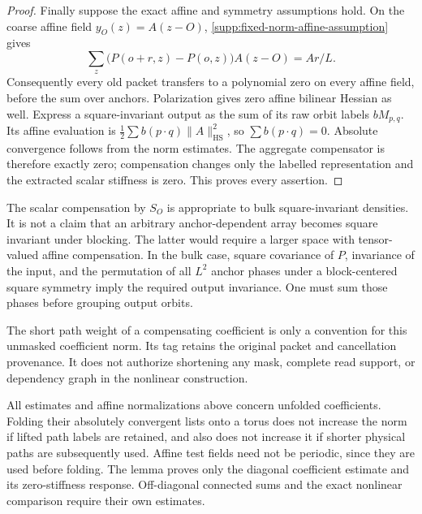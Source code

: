 \begin{proof}
Finally suppose the exact affine and symmetry assumptions hold.  On
the coarse affine field $y_O(z)=A(z-O)$,
\eqref{supp:fixed-norm-affine-assumption} gives
\[
 \sum_z\bigl(P(o+r,z)-P(o,z)\bigr)A(z-O)=Ar/L.
\]
Consequently every old packet transfers to a polynomial zero on every
affine field, before the sum over anchors.  Polarization gives zero
affine bilinear Hessian as well.  Express a square-invariant output as
the sum of its raw orbit labels $bM_{p,q}$.  Its affine evaluation is
$\frac12\sum b(p\cdot q)\|A\|_{\mathrm{HS}}^2$, so
$\sum b(p\cdot q)=0$.  Absolute convergence follows from the norm
estimates.  The aggregate compensator is therefore exactly zero;
compensation changes only the labelled representation and the extracted
scalar stiffness is zero.  This proves every assertion.
\end{proof}

\begin{remark}
The scalar compensation by $S_O$ is appropriate to bulk square-invariant
densities.  It is not a claim that an arbitrary anchor-dependent array
becomes square invariant under blocking.  The latter would require a
larger space with tensor-valued affine compensation.  In the bulk case,
square covariance of $P$, invariance of the input, and the permutation
of all $L^2$ anchor phases under a block-centered square symmetry imply
the required output invariance.  One must sum those phases before
grouping output orbits.

The short path weight of a compensating coefficient is only a convention
for this unmasked coefficient norm.  Its tag retains the original packet
and cancellation provenance.  It does not authorize shortening any mask,
complete read support, or dependency graph in the nonlinear construction.

All estimates and affine normalizations above concern unfolded
coefficients.  Folding their absolutely convergent lists onto a torus
does not increase the norm if lifted path labels are retained, and also
does not increase it if shorter physical paths are subsequently used.
Affine test fields need not be periodic, since they are used before
folding.  The lemma proves only the diagonal coefficient estimate and
its zero-stiffness response.  Off-diagonal connected sums and the exact
nonlinear comparison require their own estimates.
\end{remark}
